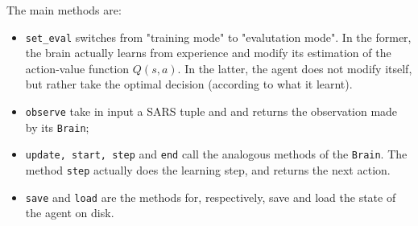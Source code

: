 The main methods are:
\begin{itemize}
	\item \texttt{set\_eval} switches from "training mode" to "evalutation mode". In the former, the brain actually learns from experience and modify its estimation of the action-value function $Q(s,a)$. In the latter, the agent does not modify itself, but rather take the optimal decision (according to what it learnt).
	\item \texttt{observe} take in input a SARS tuple and and returns the observation made by its \texttt{Brain};
	\item \texttt{update, start, step} and \texttt{end} call the analogous methods of the \texttt{Brain}. The method \texttt{step} actually does the learning step, and returns the next action.
	\item \texttt{save} and \texttt{load} are the methods for, respectively, save and load the state of the agent on disk.
\end{itemize}

